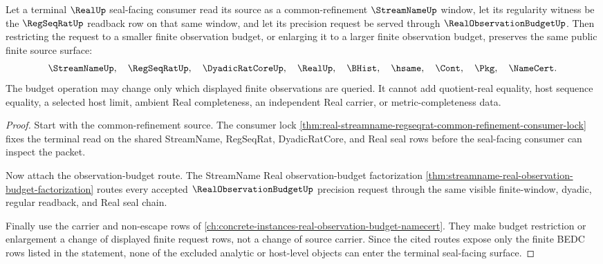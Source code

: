 \begin{theorem}
\label{thm:real-streamname-regseqrat-terminal-budget-stability}
Let a terminal $\RealUp$ seal-facing consumer read its source as a
common-refinement $\StreamNameUp$ window, let its regularity witness be the
$\RegSeqRatUp$ readback row on that same window, and let its precision request
be served through $\RealObservationBudgetUp$. Then restricting the request to a
smaller finite observation budget, or enlarging it to a larger finite
observation budget, preserves the same public finite source surface:
$$
\StreamNameUp,\quad \RegSeqRatUp,\quad \DyadicRatCoreUp,\quad \RealUp,\quad
\BHist,\quad \hsame,\quad \Cont,\quad \Pkg,\quad \NameCert .
$$
The budget operation may change only which displayed finite observations are
queried. It cannot add quotient-real equality, host sequence equality, a
selected host limit, ambient Real completeness, an independent Real carrier, or
metric-completeness data.
\end{theorem}
\begin{proof}
Start with the common-refinement source. The consumer lock
\autoref{thm:real-streamname-regseqrat-common-refinement-consumer-lock} fixes
the terminal read on the shared StreamName, RegSeqRat, DyadicRatCore, and Real
seal rows before the seal-facing consumer can inspect the packet.

Now attach the observation-budget route. The StreamName Real
observation-budget factorization
\autoref{thm:streamname-real-observation-budget-factorization} routes every
accepted $\RealObservationBudgetUp$ precision request through the same visible
finite-window, dyadic, regular readback, and Real seal chain.

Finally use the carrier and non-escape rows of
\autoref{ch:concrete-instances-real-observation-budget-namecert}. They make
budget restriction or enlargement a change of displayed finite request rows,
not a change of source carrier. Since the cited routes expose only the finite
BEDC rows listed in the statement, none of the excluded analytic or host-level
objects can enter the terminal seal-facing surface.
\end{proof}

